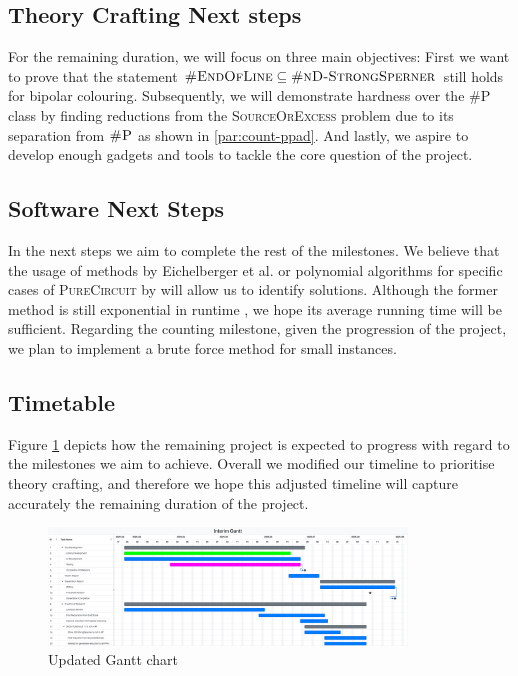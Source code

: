 \subsection{Theory Crafting Next steps}

For the remaining duration, we will focus on three main objectives:
First we want to prove that the statement $\textsc{\#EndOfLine} \subseteq \textsc{\#nD-StrongSperner}$ still
holds for bipolar colouring.
Subsequently, we will demonstrate hardness over the \textsc{\#P} class by finding
reductions from the \textsc{SourceOrExcess} problem due to its separation from $\textsc{\#P}$ as shown in \ref{par:count-ppad}.
And lastly, we aspire to develop enough gadgets and tools to tackle the core question of the project.


\subsection{Software Next Steps}

In the next steps we aim to complete the rest of the milestones. 
We believe that the usage of methods by Eichelberger et al. \cite{eichelberger_HazardDetectionCombinational_1965}
or polynomial algorithms for specific cases of \textsc{PureCircuit} by \cite{deligkas_PureCircuitTightInapproximability_2024}
will allow us to identify solutions.
Although the former method is still exponential in runtime \cite{eichelberger_HazardDetectionCombinational_1965,ikenmeyer_ComplexityHazardfreeCircuits_2019},
we hope its average running time will be sufficient.
Regarding the counting milestone, given the progression of the project, we plan to implement a brute force method
for small instances.

\subsection{Timetable}

Figure \ref{fig:gantt-new} depicts how the remaining project is expected to progress with regard
to the milestones we aim to achieve. Overall we modified our timeline to prioritise
theory crafting, and therefore we hope this adjusted timeline will capture accurately the remaining duration
of the project.

\begin{figure}[h!]
    \centering
    \includegraphics[width=0.85\textwidth]{assets/Interim Gantt 20250708.pdf}
    \caption{Updated Gantt chart}\label{fig:gantt-new}
\end{figure}

